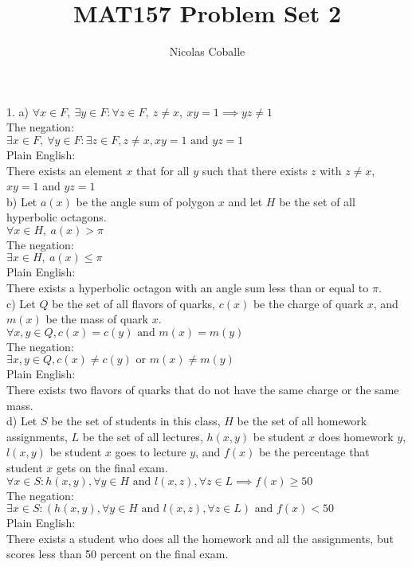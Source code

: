 \documentclass[11pt]{article}
\title{MAT157 Problem Set 2}
\author{Nicolas Coballe}
\begin{document}
\maketitle
\begin{flushleft}

1. a) $\forall x \in F, \ \exists y \in F : \forall z \in F, \ z \neq x, \ xy = 1 \implies yz \neq 1$ \\
The negation: \\
$\exists x \in F, \ \forall y \in F: \exists z \in F, z \neq x, xy = 1 \text{ and } yz = 1$ \\
Plain English: \\
There exists an element $x$ that for all $y$ such that there exists $z$ with $z \neq x$, $xy = 1$ and $yz = 1$ \\
\bigskip
b) Let $a(x)$ be the angle sum of polygon $x$ and let $H$ be the set of all hyperbolic octagons. \\
$\forall x \in H, \ a(x) > \pi$ \\
The negation:  \\
$\exists x \in H, \ a(x) \leq \pi$ \\
Plain English: \\
There exists a hyperbolic octagon with an angle sum less than or equal to $\pi$. \\
\bigskip
c) Let $Q$ be the set of all flavors of quarks, $c(x)$ be the charge of quark $x$, and $m(x)$ be the mass of quark $x$. \\
$\forall x,y \in Q, c(x) = c(y) \text{ and } m(x) = m(y)$ \\
The negation: \\
$\exists x,y \in Q, c(x) \neq c(y) \text{ or } m(x) \neq m(y)$ \\
Plain English: \\
There exists two flavors of quarks that do not have the same charge or the same mass. \\
\bigskip
d) Let $S$ be the set of students in this class, $H$ be the set of all homework assignments, $L$ be the set of all lectures, $h(x,y)$ be student $x$ does homework $y$, $l(x,y)$ be student $x$ goes to lecture $y$, and $f(x)$ be the percentage that student $x$ gets on the final exam. \\
$\forall x \in S: h(x,y), \forall y \in H \text{ and } l(x,z), \forall z \in L \implies f(x) \geq 50$ \\
The negation: \\
$\exists x \in S: (h(x,y), \forall y \in H \text{ and } l(x,z), \forall z \in L) \text{ and } f(x) < 50$ \\
Plain English: \\
There exists a student who does all the homework and all the assignments, but scores less than 50 percent on the final exam. \\


\end{flushleft}
\end{document}
